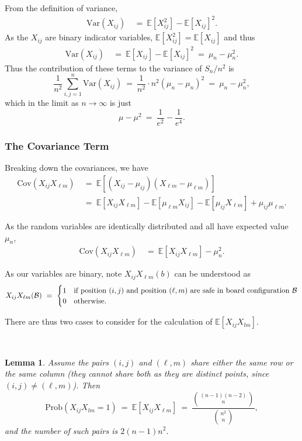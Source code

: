 \documentclass[12pt,reqno]{amsart}
\newcommand{\E}{\mathbb{E}}
\renewcommand{\E}{\mathbb{E}}
\numberwithin{equation}{section}
\newtheorem{lem}[thm]{Lemma}
\theoremstyle{plain}
\newcommand\be{\begin{equation}}
\newcommand\ee{\end{equation}}
\newcommand{\ncr}[2]{{#1 \choose #2}}
\newcommand{\twocase}[5]{#1 \begin{cases} #2 & \text{{\rm #3}}\\ #4 &\text{{\rm #5}} \end{cases}}
\begin{document}
From the definition of variance,
\begin{align}
   \text{Var}\left(X_{ij}\right) &\ = \  \E[X_{ij}^2] - \E[X_{ij}]^2.
\end{align} As the $X_{ij}$ are binary indicator variables, $\E[X_{ij}^2] = \E[X_{ij}]$ and thus
\begin{align}
   \text{Var}\left(X_{ij}\right) &\ = \  \E[X_{ij}] - \E[X_{ij}]^2 \  = \ \mu_n - \mu_n^2.
\end{align}  Thus the contribution of these terms to the variance of $S_n/n^2$ is \be \frac1{n^2} \sum_{i,j = 1}^n \text{Var}(X_{ij}) \ = \ \frac1{n^2} \cdot n^2 (\mu_n - \mu_n)^2 \ = \ \mu_n - \mu_n^2,\ee which in the limit as $n\to\infty$ is just \be \mu - \mu^2 \ = \ \frac1{e^2} - \frac1{e^4}. \ee


\subsubsection{The Covariance Term}

Breaking down the covariances, we have
\begin{align}
    \text{Cov}\left(X_{ij}X_{\ell m}\right) &\ = \  \E[\left(X_{ij} - \mu_{ij}\right)\left(X_{\ell m} - \mu_{\ell m}\right)]\nonumber\\
    &\ = \  \E[X_{ij}X_{\ell m}] - \E[\mu_{\ell m}X_{ij}] - \E[\mu_{ij}X_{\ell m}] + \mu_{ij}\mu_{\ell m}.
\end{align}

As the random variables are identically distributed and all have expected value $\mu_n$,
\begin{align}
    \text{Cov}\left(X_{ij}X_{\ell m}\right) &\ = \  \E[X_{ij}X_{\ell m}] - \mu_n^2.
\end{align}

As our variables are binary, note $X_{ij}X_{\ell m}(b)$ can be understood as
\be
\twocase{X_{ij}X_{\ell m}(\mathcal{B})\ = \ }{1}{if position $(i, j)$ and position $(\ell,m)$ are safe in board configuration $\mathcal{B}$}{0}{otherwise.} \ee

There are thus two cases to consider for the calculation of $\E[X_{ij}X_{lm}]$.

\ \\

\begin{lem}\label{lem:pairsoverlap} Assume the pairs $(i,j)$ and $(\ell, m)$ share either the same row or the same column (they cannot share both as they are distinct points, since $(i,j) \neq (\ell, m)$). Then \be \text{Prob}\left(X_{ij}X_{lm} = 1\right)\ =\ \E[X_{ij} X_{\ell m}] \ = \ \frac{\ncr{(n-1)(n-2)}{n}}{\ncr{n^2}{n}}, \ee and the number of such pairs is $2(n-1)n^2$. \end{lem}
\end{document}
